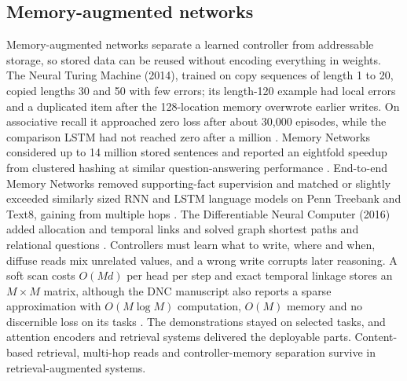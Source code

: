 \subsection{Memory-augmented networks}
Memory-augmented networks separate a learned controller from addressable storage, so stored data can be reused without encoding everything in weights. The Neural Turing Machine (2014), trained on copy sequences of length 1 to 20, copied lengths 30 and 50 with few errors; its length-120 example had local errors and a duplicated item after the 128-location memory overwrote earlier writes. On associative recall it approached zero loss after about 30,000 episodes, while the comparison LSTM had not reached zero after a million \cite{pre31}. Memory Networks considered up to 14 million stored sentences and reported an eightfold speedup from clustered hashing at similar question-answering performance \cite{pre32}. End-to-end Memory Networks removed supporting-fact supervision and matched or slightly exceeded similarly sized RNN and LSTM language models on Penn Treebank and Text8, gaining from multiple hops \cite{pre33}. The Differentiable Neural Computer (2016) added allocation and temporal links and solved graph shortest paths and relational questions \cite{pre34}. Controllers must learn what to write, where and when, diffuse reads mix unrelated values, and a wrong write corrupts later reasoning. A soft scan costs $O(Md)$ per head per step and exact temporal linkage stores an $M\times M$ matrix, although the DNC manuscript also reports a sparse approximation with $O(M\log M)$ computation, $O(M)$ memory and no discernible loss on its tasks \cite{pre34}. The demonstrations stayed on selected tasks, and attention encoders and retrieval systems delivered the deployable parts. Content-based retrieval, multi-hop reads and controller-memory separation survive in retrieval-augmented systems.

